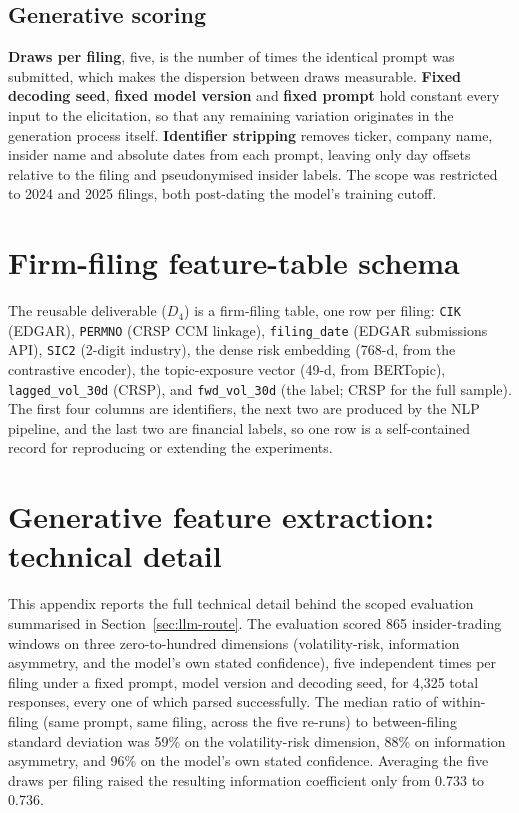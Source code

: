 \documentclass[logo,msc,ai]{infthesis}        %
\begin{document}
\section*{Generative scoring}
\textbf{Draws per filing}, five, is the number of times the identical prompt was submitted, which makes the dispersion between draws measurable. \textbf{Fixed decoding seed}, \textbf{fixed model version} and \textbf{fixed prompt} hold constant every input to the elicitation, so that any remaining variation originates in the generation process itself. \textbf{Identifier stripping} removes ticker, company name, insider name and absolute dates from each prompt, leaving only day offsets relative to the filing and pseudonymised insider labels. The scope was restricted to 2024 and 2025 filings, both post-dating the model's training cutoff.

\chapter{Firm-filing feature-table schema}
\label{app:schema}
The reusable deliverable ($D_4$) is a firm-filing table, one row per filing: \texttt{CIK} (EDGAR), \texttt{PERMNO} (CRSP CCM linkage), \texttt{filing\_date} (EDGAR submissions API), \texttt{SIC2} (2-digit industry), the dense risk embedding (768-d, from the contrastive encoder), the topic-exposure vector (49-d, from BERTopic), \texttt{lagged\_vol\_30d} (CRSP), and \texttt{fwd\_vol\_30d} (the label; CRSP for the full sample). The first four columns are identifiers, the next two are produced by the NLP pipeline, and the last two are financial labels, so one row is a self-contained record for reproducing or extending the experiments.

\chapter{Generative feature extraction: technical detail}
\label{app:llm-pilot}
This appendix reports the full technical detail behind the scoped evaluation summarised in Section~\ref{sec:llm-route}. The evaluation scored 865 insider-trading windows on three zero-to-hundred dimensions (volatility-risk, information asymmetry, and the model's own stated confidence), five independent times per filing under a fixed prompt, model version and decoding seed, for 4,325 total responses, every one of which parsed successfully. The median ratio of within-filing (same prompt, same filing, across the five re-runs) to between-filing standard deviation was 59\% on the volatility-risk dimension, 88\% on information asymmetry, and 96\% on the model's own stated confidence. Averaging the five draws per filing raised the resulting information coefficient only from 0.733 to 0.736.
\end{document}
